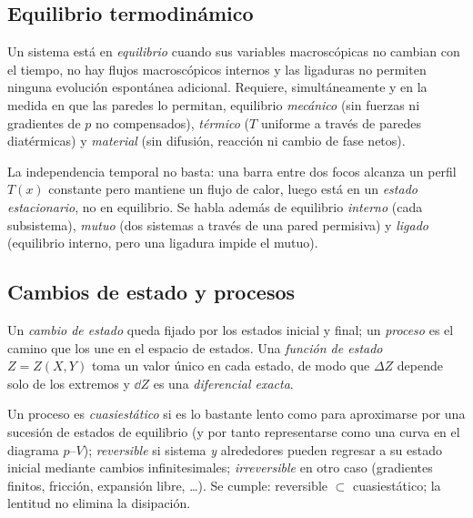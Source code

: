 \subsection{Equilibrio termodinámico}

\begin{definicion}
Un sistema está en \emph{equilibrio} cuando sus variables macroscópicas no cambian con el tiempo,
no hay flujos macroscópicos internos y las ligaduras no permiten ninguna evolución espontánea
adicional. Requiere, simultáneamente y en la medida en que las paredes lo permitan, equilibrio
\emph{mecánico} (sin fuerzas ni gradientes de $p$ no compensados), \emph{térmico} ($T$ uniforme a
través de paredes diatérmicas) y \emph{material} (sin difusión, reacción ni cambio de fase netos).
\end{definicion}

\begin{observacion}
La independencia temporal no basta: una barra entre dos focos alcanza un perfil $T(x)$ constante
pero mantiene un flujo de calor, luego está en un \emph{estado estacionario}, no en equilibrio. Se
habla además de equilibrio \emph{interno} (cada subsistema), \emph{mutuo} (dos sistemas a través de
una pared permisiva) y \emph{ligado} (equilibrio interno, pero una ligadura impide el mutuo).
\end{observacion}

\subsection{Cambios de estado y procesos}

\begin{definicion}
Un \emph{cambio de estado} queda fijado por los estados inicial y final; un \emph{proceso} es el
camino que los une en el espacio de estados. Una \emph{función de estado} $Z=Z(X,Y)$ toma un valor
único en cada estado, de modo que $\Delta Z$ depende solo de los extremos y $\dd Z$ es una
\emph{diferencial exacta}.
\end{definicion}

\begin{definicion}
Un proceso es \emph{cuasiestático} si es lo bastante lento como para aproximarse por una sucesión
de estados de equilibrio (y por tanto representarse como una curva en el diagrama $p$--$V$);
\emph{reversible} si sistema \emph{y} alrededores pueden regresar a su estado inicial mediante
cambios infinitesimales; \emph{irreversible} en otro caso (gradientes finitos, fricción, expansión
libre, \dots). Se cumple: reversible $\subset$ cuasiestático; la lentitud no elimina la disipación.
\end{definicion}

